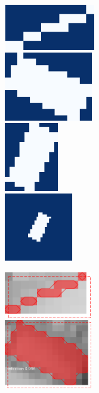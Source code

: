 \begin{figure}[ht]
\begin{minipage}[c]{.3\textwidth}
  \end{minipage}
  \begin{minipage}[c]{.3\textwidth}
  \centering
  \includegraphics[height=2cm]{pics/mask-2-1.png}
  \\ \vspace{.25cm}
  \includegraphics[height=3cm]{pics/mask-2-2.png}
  \\ \vspace{.25cm}
  \includegraphics[height=3cm]{pics/mask-2-3.png}
  \\ \vspace{.25cm}
  \includegraphics[height=3cm]{pics/mask-2-4.png}
  \end{minipage}
  \begin{minipage}[c]{.3\textwidth}
  \centering
  \includegraphics[height=2cm]{pics/pred-2-1.png}
  \\ \vspace{.25cm}
  \includegraphics[height=3cm]{pics/pred-2-2.png}

\end{minipage}
\end{figure}
